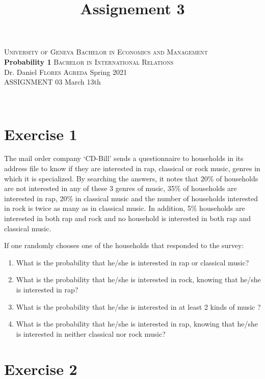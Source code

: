 \documentclass[12pt,thmsa]{article}\usepackage[]{graphicx}\usepackage[]{color}
\title{Assignement 3}
\begin{document}
\noindent \textsc{University of Geneva}     \hfill \textsc{Bachelor in Economics and Management} \\
\textbf{Probability 1}                      \hfill \textsc{Bachelor in International Relations} \\
Dr. Daniel \textsc{Flores Agreda}                 \hfill Spring 2021  \\
ASSIGNMENT 03                               \hfill   March 13th



\noindent
\makebox[\linewidth]{\rule{\textwidth}{0.4pt}}\\[1.5ex]

\section*{Exercise 1}


The mail order company `CD-Bill' sends a questionnaire to households
in its address file to know if they are interested in rap,
classical or rock  music, genres in which it is specialized. By searching the answers, it
notes that 20\% of households are not interested in any of these 3 genres of music, 35\% of households are interested in rap, 20\% in classical music and the number of households interested in rock is twice as many as in classical music. In addition, 5\%
households are interested in both rap and rock and no household is interested
in both rap and classical music.

\medskip

\noindent If one randomly chooses one of the households that responded to the
  survey:

 \begin{enumerate}%
 \item What is the probability that he/she is interested in rap or
classical music?


 \item What is the probability that he/she is interested in rock, knowing
that he/she is interested in rap?


 \item What is the probability that he/she is interested in at least 2 kinds of
music ?

 \item What is the probability that he/she is interested in rap, knowing that he/she is interested in neither classical nor rock music?
 \end{enumerate}


\section*{Exercise 2}
\end{document}
